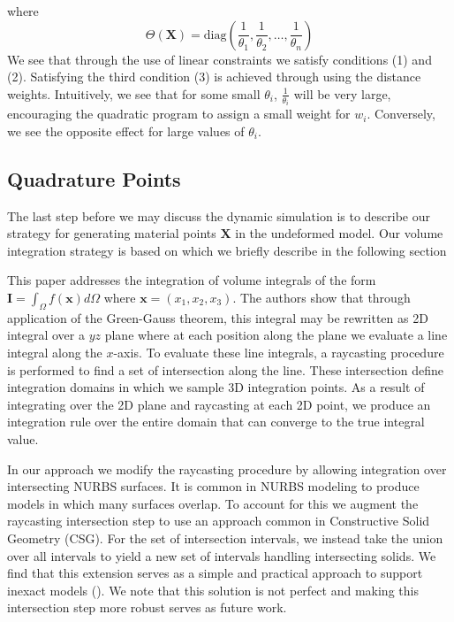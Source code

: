 where
\begin{equation}
     \Theta(\mathbf{X}) = \text{diag}\left( \frac{1}{\theta_1},\frac{1}{\theta_2},\dots,\frac{1}{\theta_n}\right)
\end{equation}
We see that through the use of linear constraints we satisfy conditions (1) and (2). Satisfying the third condition (3) is achieved through using the distance weights. Intuitively, we see that for some small $\theta_i$, $\frac{1}{\theta_i}$ will be very large, encouraging the quadratic program to assign a small weight for $w_i$. Conversely, we see the opposite effect for large values of $\theta_i$.


\subsection{Quadrature Points}
The last step before we may discuss the dynamic simulation is to describe our strategy for generating material points $\mathbf{X}$ in the undeformed model. Our volume integration strategy is based on \cite{KHOSRAVIFARD201030} which we briefly describe in the following section

This paper addresses the integration of volume integrals of the form $\mathbf{I} = \int_\Omega f(\mathbf{x}) d\Omega$ where $\mathbf{x} = (x_1,x_2,x_3)$. The authors show that through application of the Green-Gauss theorem, this integral may be rewritten as 2D integral over a $yz$ plane where at each position along the plane we evaluate a line integral along the $x$-axis. To evaluate these line integrals, a raycasting procedure is performed to find a set of intersection along the line. These intersection define integration domains in which we sample 3D integration points. As a result of integrating over the 2D plane and raycasting at each 2D point, we produce an integration rule over the entire domain that can converge to the true integral value.

In our approach we modify the raycasting procedure by allowing integration over intersecting NURBS surfaces. It is common in NURBS modeling to produce models in which many surfaces overlap. To account for this we augment the raycasting intersection step to use an approach common in Constructive Solid Geometry (CSG). For the set of intersection intervals, we instead take the union over all intervals to yield a new set of intervals handling intersecting solids. We find that this extension serves as a simple and practical approach to support inexact models (). We note that this solution is not perfect and making this intersection step more robust serves as future work.

